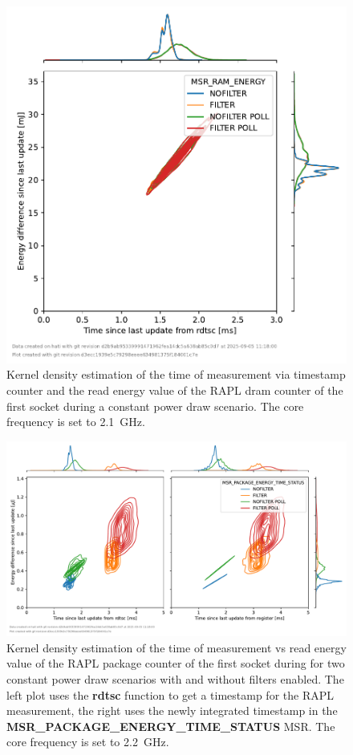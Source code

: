 \begin{figure}[]
    \centering
    \includegraphics[width=0.54\columnwidth]{fig/rapl-update-intervals/MSR_RAM_ENERGY_2100000.pdf}
    \caption{Kernel density estimation of the time of measurement via timestamp counter and the read energy value of the RAPL dram counter of the first socket during a constant power draw scenario.
    The core frequency is set to \SI{2.1}{\GHz}.}
\end{figure}

\clearpage
\begin{figure}[]
    \centering
    \includegraphics[width=\columnwidth]{fig/rapl-update-intervals/MSR_PACKAGE_ENERGY_TIME_STATUS_2200000.pdf}
    \caption{Kernel density estimation of the time of measurement vs read energy value of the RAPL package counter of the first socket during for two constant power draw scenarios with and without filters enabled.
    The left plot uses the \textbf{rdtsc} function to get a timestamp for the RAPL measurement, the right uses the newly integrated timestamp in the \textbf{MSR\_PACKAGE\_ENERGY\_TIME\_STATUS} MSR.
    The core frequency is set to \SI{2.2}{\GHz}.}
\end{figure}

